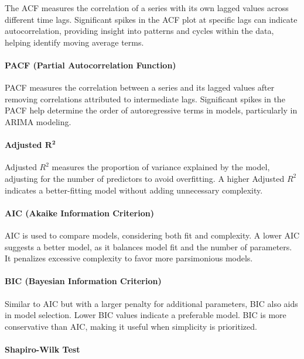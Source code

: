 \documentclass[11pt]{article}
\begin{document}
The ACF measures the correlation of a series with its own lagged values across different time lags. Significant spikes in the ACF plot at specific lags can indicate autocorrelation, providing insight into patterns and cycles within the data, helping identify moving average terms.

\paragraph{PACF (Partial Autocorrelation Function)}

PACF measures the correlation between a series and its lagged values after removing correlations attributed to intermediate lags. Significant spikes in the PACF help determine the order of autoregressive terms in models, particularly in ARIMA modeling.

\paragraph{Adjusted $\mathbf{R^{2}}$}

Adjusted $R^{2}$ measures the proportion of variance explained by the model, adjusting for the number of predictors to avoid overfitting. A higher Adjusted $R^{2}$ indicates a better-fitting model without adding unnecessary complexity.

\paragraph{AIC (Akaike Information Criterion)}

AIC is used to compare models, considering both fit and complexity. A lower AIC suggests a better model, as it balances model fit and the number of parameters. It penalizes excessive complexity to favor more parsimonious models.

\paragraph{BIC (Bayesian Information Criterion)}

Similar to AIC but with a larger penalty for additional parameters, BIC also aids in model selection. Lower BIC values indicate a preferable model. BIC is more conservative than AIC, making it useful when simplicity is prioritized.

\paragraph{Shapiro-Wilk Test}
\end{document}

